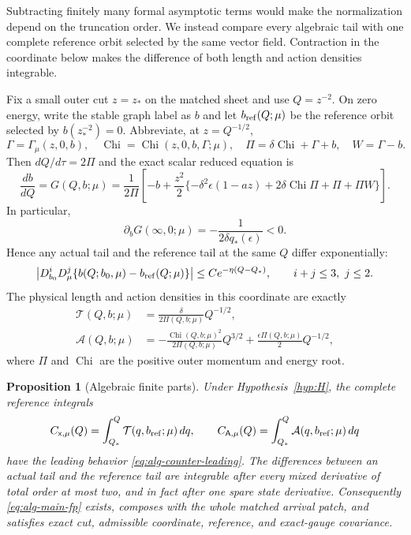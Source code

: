 \documentclass[11pt,reqno]{amsart}
\numberwithin{equation}{section}
\newtheorem{proposition}[theorem]{Proposition}
\theoremstyle{definition}
\theoremstyle{remark}
\newcommand{\Chi}{\operatorname{Chi}}
\begin{document}
Subtracting finitely many formal asymptotic terms would make the normalization
depend on the truncation order.  We instead compare every algebraic tail with
one complete reference orbit selected by the same vector field.  Contraction
in the coordinate below makes the difference of both length and action
densities integrable.

Fix a small outer cut $z=z_*$ on the matched sheet and use
$Q=z^{-2}$.  On zero energy, write the stable graph label as $b$ and let
$b_{\rm ref}(Q;\mu)$ be the reference orbit selected by $b(z_*^{-2})=0$.
Abbreviate, at $z=Q^{-1/2}$,
\[
 \Gamma=\Gamma_\mu(z,0,b),\quad
 \Chi=\Chi(z,0,b,\Gamma;\mu),\quad
 \Pi=\delta\Chi+\Gamma+b,\quad W=\Gamma-b .
\]
Then $dQ/d\tau=2\Pi$ and the exact scalar reduced equation is
\begin{equation}\label{eq:outer-reduced-G}
 \frac{db}{dQ}=G(Q,b;\mu)
 =\frac1{2\Pi}\left[
  -b+\frac{z^2}{2}
  \{-\delta^2\epsilon(1-az)+2\delta\Chi\Pi+\Pi+\Pi W\}\right].
\end{equation}
In particular,
\begin{equation}\label{eq:stable-rate}
 \partial_bG(\infty,0;\mu)
 =-\frac1{2\delta q_*(\epsilon)}<0.
\end{equation}
Hence any actual tail and the reference tail at the same $Q$ differ
exponentially:
\begin{equation}\label{eq:flat-shadow}
 \left|D_{b_0}^iD_\mu^j
   \{b(Q;b_0,\mu)-b_{\rm ref}(Q;\mu)\}\right|
 \le Ce^{-\eta(Q-Q_*)},\qquad i+j\le3,\ j\le2.
\end{equation}
The physical length and action densities in this coordinate are exactly
\begin{equation}\label{eq:outer-densities}
 \begin{aligned}
  \mathcal T(Q,b;\mu)
   &=\frac{\delta}{2\Pi(Q,b;\mu)}Q^{-1/2},\\
  \mathcal A(Q,b;\mu)
   &=-\frac{\Chi(Q,b;\mu)^2}{2\Pi(Q,b;\mu)}Q^{3/2}
     +\frac{\epsilon\Pi(Q,b;\mu)}2Q^{-1/2},
 \end{aligned}
\end{equation}
where $\Pi$ and $\Chi$ are the positive outer momentum and energy root.

\begin{proposition}[Algebraic finite parts]\label{prop:alg-fp}
Under Hypothesis~\ref{hyp:H}, the complete reference integrals
\begin{equation}\label{eq:reference-counterterms}
 C_{\mathsf x,\mu}(Q)=\int_{Q_*}^Q\mathcal T(q,b_{\rm ref};\mu)\,dq,
 \qquad
 C_{\mathsf A,\mu}(Q)=\int_{Q_*}^Q\mathcal A(q,b_{\rm ref};\mu)\,dq
\end{equation}
have the leading behavior \eqref{eq:alg-counter-leading}.  The differences
between an actual tail and the reference tail are integrable after every
mixed derivative of total order at most two, and in fact after one spare
state derivative.  Consequently \eqref{eq:alg-main-fp} exists, composes with
the whole matched arrival patch, and satisfies exact cut, admissible
coordinate, reference, and exact-gauge covariance.
\end{proposition}
\end{document}
